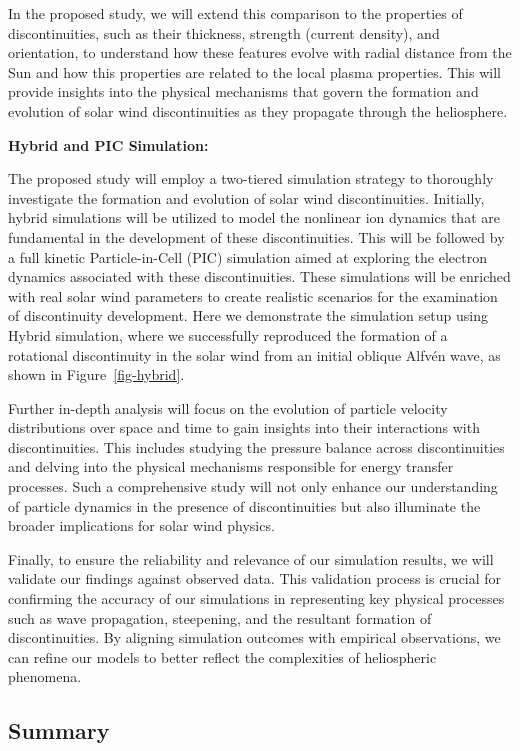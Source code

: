 \documentclass[
  letterpaper,
  DIV=11,
  numbers=noendperiod]{scrartcl}
\begin{document}
In the proposed study, we will extend this comparison to the properties of discontinuities, such as their thickness, strength (current density), and orientation, to understand how these features evolve with radial distance from the Sun and how this properties are related to the local plasma properties. This will provide insights into the physical mechanisms that govern the formation and evolution of solar wind discontinuities as they propagate through the heliosphere.

\textbf{Hybrid and PIC Simulation:}

The proposed study will employ a two-tiered simulation strategy to thoroughly investigate the formation and evolution of solar wind discontinuities. Initially, hybrid simulations will be utilized to model the nonlinear ion dynamics that are fundamental in the development of these discontinuities. This will be followed by a full kinetic Particle-in-Cell (PIC) simulation aimed at exploring the electron dynamics associated with these discontinuities. These simulations will be enriched with real solar wind parameters to create realistic scenarios for the examination of discontinuity development. Here we demonstrate the simulation setup using Hybrid simulation, where we successfully reproduced the formation of a rotational discontinuity in the solar wind from an initial oblique Alfvén wave, as shown in Figure~\ref{fig-hybrid}.

Further in-depth analysis will focus on the evolution of particle velocity distributions over space and time to gain insights into their interactions with discontinuities. This includes studying the pressure balance across discontinuities and delving into the physical mechanisms responsible for energy transfer processes. Such a comprehensive study will not only enhance our understanding of particle dynamics in the presence of discontinuities but also illuminate the broader implications for solar wind physics.

Finally, to ensure the reliability and relevance of our simulation results, we will validate our findings against observed data. This validation process is crucial for confirming the accuracy of our simulations in representing key physical processes such as wave propagation, steepening, and the resultant formation of discontinuities. By aligning simulation outcomes with empirical observations, we can refine our models to better reflect the complexities of heliospheric phenomena.

\subsection{Summary}\label{summary}
\end{document}
